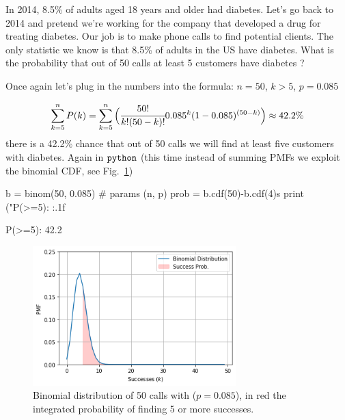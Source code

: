 In 2014, 8.5\% of adults aged 18 years and older had diabetes. Let's go back to 2014 and pretend we're working for the company that developed a drug for treating diabetes. Our job is to make phone calls to find potential clients. The only statistic we know is that 8.5\% of adults in the US have diabetes. What is the probability that out of 50 calls at least 5 customers have diabetes ? 

Once again let's plug in the numbers into the formula: \(n = 50\), \(k > 5\), \(p = 0.085\)

\[\sum_{k=5}^{n}P(k) = \sum_{k=5}^{n}\Big(\cfrac{50!}{k!(50 - k)!}0.085^{k}(1-0.085)^{(50-k)}\Big) \approx 42.2\% \]
there is a 42.2\% chance that out of 50 calls we will find at least five customers with diabetes. Again in \(\tt{python}\) (this time instead of summing PMFs we exploit the binomial CDF, see Fig.~\ref{fig:binomial_cdf})

\begin{ipython}
b = binom(50, 0.085) # params (n, p)
prob = b.cdf(50)-b.cdf(4)s
print ("P(>=5): {:.1f}%

P(>=5): 42.2%
\end{ipython}

\begin{figure}[htb]
\centering
\includegraphics[width=0.7\textwidth]{figures/binomial_5_0.png}
\caption{Binomial distribution of 50 calls with ($p=0.085$), in red the integrated probability of finding 5 or more successes.}
\label{fig:binomial_cdf}
\end{figure}
